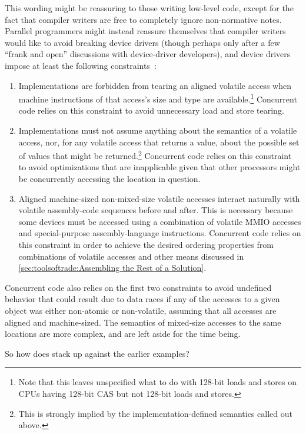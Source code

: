 This wording might be reassuring to those writing low-level code, except
for the fact that compiler writers are free to completely ignore
non-normative notes.
Parallel programmers might instead reassure themselves that compiler
writers would like to avoid breaking device drivers (though perhaps
only after a few ``frank and open'' discussions with device-driver
developers), and device drivers impose at least the following
constraints~\cite{PaulEMcKenney2016P0124R6-LKMM}:

\begin{enumerate}
\item	Implementations are forbidden from tearing an aligned volatile
	access when machine instructions of that access's size and type
	are available.\footnote{
		Note that this leaves unspecified what to do with 128-bit
		loads and stores on CPUs having 128-bit CAS but not
		128-bit loads and stores.}
	Concurrent code relies on this constraint to avoid unnecessary
	load and store tearing.
\item	Implementations must not assume anything about the semantics of
	a volatile access, nor, for any volatile access that returns a
	value, about the possible set of values that might be
	returned.\footnote{
		This is strongly implied by the implementation-defined
		semantics called out above.}
	Concurrent code relies on this constraint to avoid optimizations
	that are inapplicable given that other processors might be
	concurrently accessing the location in question.
\item	Aligned machine-sized non-mixed-size volatile accesses interact
	naturally with volatile assembly-code sequences before and after.
	This is necessary because some devices must be accessed using
	a combination of volatile MMIO accesses and special-purpose
	assembly-language instructions.
	Concurrent code relies on this constraint in order to achieve
	the desired ordering properties from combinations of volatile
	accesses and other means discussed in
	\cref{sec:toolsoftrade:Assembling the Rest of a Solution}.
\end{enumerate}

Concurrent code also relies on the first two constraints to avoid
undefined behavior that could result due to data races if any of the
accesses to a given object was either non-atomic or non-volatile,
assuming that all accesses are aligned and machine-sized.
The semantics of mixed-size accesses to the same locations are more
complex, and are left aside for the time being.

So how does  stack up against the earlier examples?


